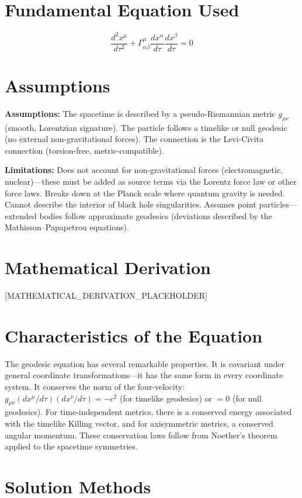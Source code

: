 \documentclass[11pt,openright]{book}
\begin{document}
\section*{Fundamental Equation Used}

\[
\frac{d^2 x^\mu}{d\tau^2}+\Gamma^\mu_{\alpha\beta}\frac{dx^\alpha}{d\tau}\frac{dx^\beta}{d\tau}=0
\]
\section*{Assumptions}

\textbf{Assumptions:} The spacetime is described by a pseudo-Riemannian metric $g_{\mu\nu}$ (smooth, Lorentzian signature). The particle follows a timelike or null geodesic (no external non-gravitational forces). The connection is the Levi-Civita connection (torsion-free, metric-compatible).


\textbf{Limitations:} Does not account for non-gravitational forces (electromagnetic, nuclear)---these must be added as source terms via the Lorentz force law or other force laws. Breaks down at the Planck scale where quantum gravity is needed. Cannot describe the interior of black hole singularities. Assumes point particles---extended bodies follow approximate geodesics (deviations described by the Mathisson--Papapetrou equations).


\section*{Mathematical Derivation}

[MATHEMATICAL_DERIVATION_PLACEHOLDER]

\section*{Characteristics of the Equation}

The geodesic equation has several remarkable properties. It is covariant under general coordinate transformations---it has the same form in every coordinate system. It conserves the norm of the four-velocity: $g_{\mu\nu}(dx^\mu/d\tau)(dx^\nu/d\tau) = -c^2$ (for timelike geodesics) or $= 0$ (for null geodesics). For time-independent metrics, there is a conserved energy associated with the timelike Killing vector, and for axisymmetric metrics, a conserved angular momentum. These conservation laws follow from Noether's theorem applied to the spacetime symmetries.
\section*{Solution Methods}
\end{document}
